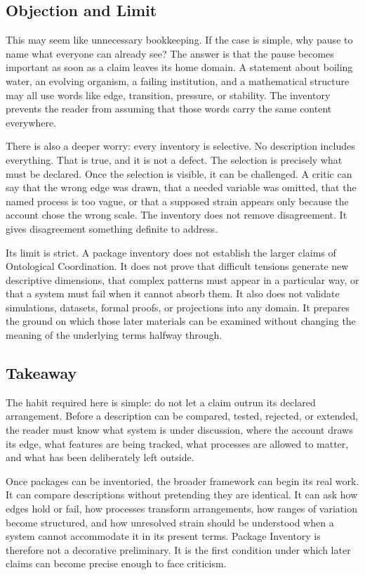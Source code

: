 \documentclass[11pt,a4paper,openany]{book}
\begin{document}
\subsection{Objection and Limit}
This may seem like unnecessary bookkeeping. If the case is simple, why pause to name what everyone can already see? The answer is that the pause becomes important as soon as a claim leaves its home domain. A statement about boiling water, an evolving organism, a failing institution, and a mathematical structure may all use words like edge, transition, pressure, or stability. The inventory prevents the reader from assuming that those words carry the same content everywhere. \cite{goldenfeld_lectures,kadanoff_scaling}\par
There is also a deeper worry: every inventory is selective. No description includes everything. That is true, and it is not a defect. The selection is precisely what must be declared. Once the selection is visible, it can be challenged. A critic can say that the wrong edge was drawn, that a needed variable was omitted, that the named process is too vague, or that a supposed strain appears only because the account chose the wrong scale. The inventory does not remove disagreement. It gives disagreement something definite to address.\par
Its limit is strict. A package inventory does not establish the larger claims of Ontological Coordination. It does not prove that difficult tensions generate new descriptive dimensions, that complex patterns must appear in a particular way, or that a system must fail when it cannot absorb them. It also does not validate simulations, datasets, formal proofs, or projections into any domain. It prepares the ground on which those later materials can be examined without changing the meaning of the underlying terms halfway through.\par
\subsection{Takeaway}
The habit required here is simple: do not let a claim outrun its declared arrangement. Before a description can be compared, tested, rejected, or extended, the reader must know what system is under discussion, where the account draws its edge, what features are being tracked, what processes are allowed to matter, and what has been deliberately left outside. \cite{goldenfeld_lectures,kadanoff_scaling}\par
Once packages can be inventoried, the broader framework can begin its real work. It can compare descriptions without pretending they are identical. It can ask how edges hold or fail, how processes transform arrangements, how ranges of variation become structured, and how unresolved strain should be understood when a system cannot accommodate it in its present terms. Package Inventory is therefore not a decorative preliminary. It is the first condition under which later claims can become precise enough to face criticism.\par
\end{document}
